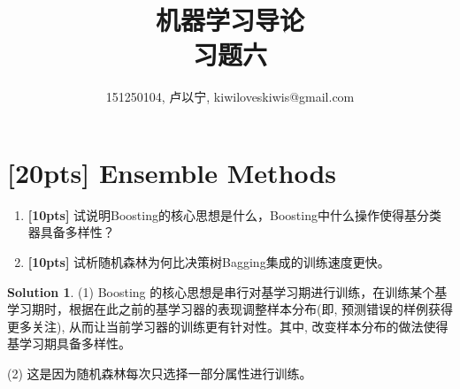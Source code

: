 \documentclass[a4paper,UTF8]{article}
\numberwithin{equation}{section}
\theoremstyle{definition}
\newtheorem*{solution}{Solution}
\begin{document}
\title{机器学习导论\\
习题六}
\author{151250104, 卢以宁,  kiwiloveskiwis@gmail.com}
\maketitle

\section{[20pts] Ensemble Methods}
\begin{enumerate}[ {(}1{)}]
\item \textbf{[10pts]} 试说明Boosting的核心思想是什么，Boosting中什么操作使得基分类器具备多样性？
\item \textbf{[10pts]} 试析随机森林为何比决策树Bagging集成的训练速度更快。
\end{enumerate}
\begin{solution}
(1) Boosting 的核心思想是串行对基学习期进行训练，在训练某个基学习期时，根据在此之前的基学习器的表现调整样本分布(即, 预测错误的样例获得更多关注),  从而让当前学习器的训练更有针对性。其中, 改变样本分布的做法使得基学习期具备多样性。

(2) 这是因为随机森林每次只选择一部分属性进行训练。
\end{solution}
\end{document}
